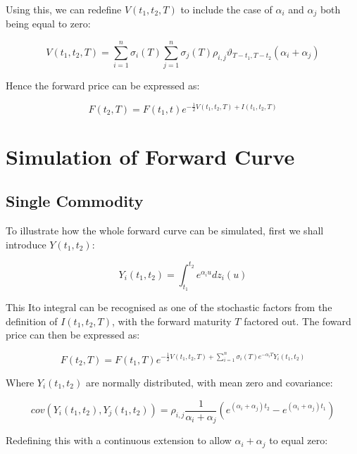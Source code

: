 \documentclass{article}
\begin{document}
\bigskip

Using this, we can redefine $V(t_1, t_2, T)$ to include the case of $\alpha_i$ and
$\alpha_j$ both being equal to zero:

\begin{equation}
    \nonumber
    V(t_1, t_2, T) = \sum_{i=1}^n \sigma_i(T) \sum_{j=1}^n \sigma_j(T) \rho_{i,j} 
    \vartheta_{T-t_1, T-t_2}(\alpha_i + \alpha_j)
\end{equation}

Hence the forward price can be expressed as:


\begin{equation}
    F(t_2, T) = F(t_1, t)e^{- \frac{1}{2} V(t_1, t_2, T) + I(t_1, t_2, T)}
\end{equation}

\bigskip
\section{Simulation of Forward Curve}
\label{appendix:fwd_sim}
\subsection{Single Commodity}
To illustrate how the whole forward curve can be simulated, first we shall
introduce $Y(t_1, t_2)$:

\begin{equation}
    Y_i(t_1, t_2) = \int_{t_1}^{t_2} e^{\alpha_iu} dz_i(u)
\end{equation}

This Ito integral can be recognised as one of the stochastic factors from the definition
of $I(t_1, t_2, T)$, with the forward maturity $T$ factored out. The foward price
can then be expressed as:

\begin{equation}
    F(t_2, T) = F(t_1, T)e^{- \frac{1}{2} V(t_1, t_2, T) + 
        \sum_{i=1}^n \sigma_i(T) e^{-\alpha_i T} Y_i(t_1, t_2) }
\end{equation}

Where $Y_i(t_1, t_2)$ are normally distributed, with mean zero and covariance:

\begin{equation}
    cov(Y_i(t_1, t_2), Y_j(t_1, t_2)) = \rho_{i, j}  \frac{1}{\alpha_i + \alpha_j}
        (e^{(\alpha_i + \alpha_j)t_2} - e^{(\alpha_i + \alpha_j)t_1})
\end{equation}

Redefining this with a continuous extension to allow $\alpha_i + \alpha_j$ to equal
zero:
\end{document}
